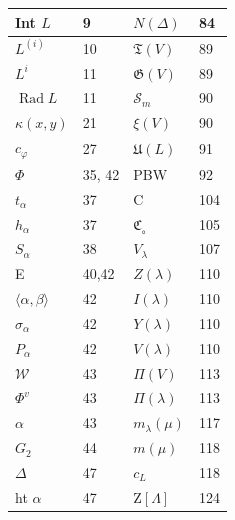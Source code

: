 \documentclass[10pt]{article}
\begin{document}
\begin{center}
\begin{tabular}{|l|l|l|l|}
Int $L$ & 9 & $N(\Delta)$ & 84 \\
\hline
$L^{(i)}$ & 10 & $\mathfrak{T}(V)$ & 89 \\
\hline
$L^{i}$ & 11 & $\mathfrak{G}(V)$ & 89 \\
\hline
$\operatorname{Rad} L$ & 11 & $\mathscr{S}_{m}$ & 90 \\
\hline
$\kappa(x, y)$ & 21 & $\mathbb{\xi}(V)$ & 90 \\
\hline
$c_{\varphi}$ & 27 & $\mathfrak{U}(L)$ & 91 \\
\hline
$\Phi$ & 35, 42 & PBW & 92 \\
\hline
$t_{\alpha}$ & 37 & C & 104 \\
\hline
$h_{\alpha}$ & 37 & $\mathfrak{C}_{\text {。 }}$ & 105 \\
\hline
$S_{\alpha}$ & 38 & $V_{\lambda}$ & 107 \\
\hline
E & 40,42 & $Z(\lambda)$ & 110 \\
\hline
$\langle\alpha, \beta\rangle$ & 42 & $I(\lambda)$ & 110 \\
\hline
$\sigma_{\alpha}$ & 42 & $Y(\lambda)$ & 110 \\
\hline
$P_{\alpha}$ & 42 & $V(\lambda)$ & 110 \\
\hline
$\mathscr{W}$ & 43 & $\Pi(V)$ & 113 \\
\hline
$\Phi^{v}$ & 43 & $\Pi(\lambda)$ & 113 \\
\hline
$\alpha$ & 43 & $m_{\lambda}(\mu)$ & 117 \\
\hline
$G_{2}$ & 44 & $m(\mu)$ & 118 \\
\hline
$\Delta$ & 47 & $c_{L}$ & 118 \\
\hline
ht $\alpha$ & 47 & $\mathrm{Z}[\Lambda]$ & 124 \\
\hline
\end{tabular}
\end{center}
\end{document}
